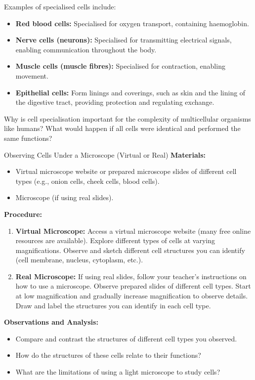 Examples of specialised cells include:

\begin{itemize}
    \item \textbf{Red blood cells:}  Specialised for oxygen transport, containing haemoglobin.
    \item \textbf{Nerve cells (neurons):}  Specialised for transmitting electrical signals, enabling communication throughout the body.
    \item \textbf{Muscle cells (muscle fibres):} Specialised for contraction, enabling movement.
    \item \textbf{Epithelial cells:}  Form linings and coverings, such as skin and the lining of the digestive tract, providing protection and regulating exchange.
\end{itemize}

\begin{stopandthink}
Why is cell specialisation important for the complexity of multicellular organisms like humans? What would happen if all cells were identical and performed the same functions?
\end{stopandthink}

\begin{investigation}{Observing Cells Under a Microscope (Virtual or Real)}
\textbf{Materials:}
\begin{itemize}
    \item Virtual microscope website or prepared microscope slides of different cell types (e.g., onion cells, cheek cells, blood cells).
    \item Microscope (if using real slides).
\end{itemize}
\textbf{Procedure:}
\begin{enumerate}
    \item \textbf{Virtual Microscope:} Access a virtual microscope website (many free online resources are available). Explore different types of cells at varying magnifications. Observe and sketch different cell structures you can identify (cell membrane, nucleus, cytoplasm, etc.).
    \item \textbf{Real Microscope:}  If using real slides, follow your teacher's instructions on how to use a microscope. Observe prepared slides of different cell types. Start at low magnification and gradually increase magnification to observe details. Draw and label the structures you can identify in each cell type.
\end{enumerate}
\textbf{Observations and Analysis:}
\begin{itemize}
    \item Compare and contrast the structures of different cell types you observed.
    \item How do the structures of these cells relate to their functions?
    \item What are the limitations of using a light microscope to study cells? 
\end{itemize}
\end{investigation}


